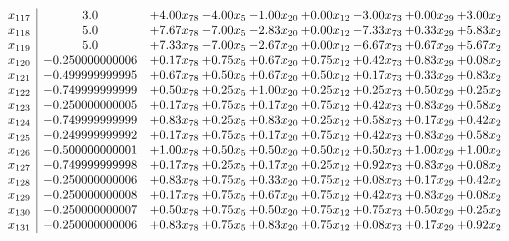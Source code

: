 \documentclass[8pt]{article}
\begin{document}
\[\begin{array}{c| c c@{\hskip 2pt} c@{\hskip 2pt} c@{\hskip 2pt} c@{\hskip 2pt} c@{\hskip 2pt} c@{\hskip 2pt} c@{\hskip 2pt} }
 x_{117}   &  3.0 & +  4.00 x_{78} & -4.00 x_{5} & -1.00 x_{20} & +  0.00 x_{12} & -3.00 x_{73} & +  0.00 x_{29} & +  3.00 x_{2}\\
 x_{118}   &  5.0 & +  7.67 x_{78} & -7.00 x_{5} & -2.83 x_{20} & +  0.00 x_{12} & -7.33 x_{73} & +  0.33 x_{29} & +  5.83 x_{2}\\
 x_{119}   &  5.0 & +  7.33 x_{78} & -7.00 x_{5} & -2.67 x_{20} & +  0.00 x_{12} & -6.67 x_{73} & +  0.67 x_{29} & +  5.67 x_{2}\\
 x_{120}   &  -0.250000000006 & +  0.17 x_{78} & +  0.75 x_{5} & +  0.67 x_{20} & +  0.75 x_{12} & +  0.42 x_{73} & +  0.83 x_{29} & +  0.08 x_{2}\\
 x_{121}   &  -0.499999999995 & +  0.67 x_{78} & +  0.50 x_{5} & +  0.67 x_{20} & +  0.50 x_{12} & +  0.17 x_{73} & +  0.33 x_{29} & +  0.83 x_{2}\\
 x_{122}   &  -0.749999999999 & +  0.50 x_{78} & +  0.25 x_{5} & +  1.00 x_{20} & +  0.25 x_{12} & +  0.25 x_{73} & +  0.50 x_{29} & +  0.25 x_{2}\\
 x_{123}   &  -0.250000000005 & +  0.17 x_{78} & +  0.75 x_{5} & +  0.17 x_{20} & +  0.75 x_{12} & +  0.42 x_{73} & +  0.83 x_{29} & +  0.58 x_{2}\\
 x_{124}   &  -0.749999999999 & +  0.83 x_{78} & +  0.25 x_{5} & +  0.83 x_{20} & +  0.25 x_{12} & +  0.58 x_{73} & +  0.17 x_{29} & +  0.42 x_{2}\\
 x_{125}   &  -0.249999999992 & +  0.17 x_{78} & +  0.75 x_{5} & +  0.17 x_{20} & +  0.75 x_{12} & +  0.42 x_{73} & +  0.83 x_{29} & +  0.58 x_{2}\\
 x_{126}   &  -0.500000000001 & +  1.00 x_{78} & +  0.50 x_{5} & +  0.50 x_{20} & +  0.50 x_{12} & +  0.50 x_{73} & +  1.00 x_{29} & +  1.00 x_{2}\\
 x_{127}   &  -0.749999999998 & +  0.17 x_{78} & +  0.25 x_{5} & +  0.17 x_{20} & +  0.25 x_{12} & +  0.92 x_{73} & +  0.83 x_{29} & +  0.08 x_{2}\\
 x_{128}   &  -0.250000000006 & +  0.83 x_{78} & +  0.75 x_{5} & +  0.33 x_{20} & +  0.75 x_{12} & +  0.08 x_{73} & +  0.17 x_{29} & +  0.42 x_{2}\\
 x_{129}   &  -0.250000000008 & +  0.17 x_{78} & +  0.75 x_{5} & +  0.67 x_{20} & +  0.75 x_{12} & +  0.42 x_{73} & +  0.83 x_{29} & +  0.08 x_{2}\\
 x_{130}   &  -0.250000000007 & +  0.50 x_{78} & +  0.75 x_{5} & +  0.50 x_{20} & +  0.75 x_{12} & +  0.75 x_{73} & +  0.50 x_{29} & +  0.25 x_{2}\\
 x_{131}   &  -0.250000000006 & +  0.83 x_{78} & +  0.75 x_{5} & +  0.83 x_{20} & +  0.75 x_{12} & +  0.08 x_{73} & +  0.17 x_{29} & +  0.92 x_{2}\\

\end{array}\]
\end{document}

